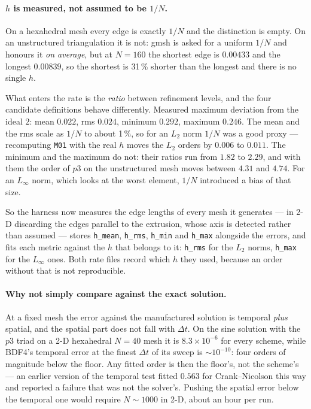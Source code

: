 \documentclass[11pt,a4paper]{article}
\newcommand{\code}[1]{\texttt{\small #1}}
\begin{document}
\paragraph{$h$ is measured, not assumed to be $1/N$.} On a hexahedral mesh every
edge is exactly $1/N$ and the distinction is empty. On an unstructured
triangulation it is not: gmsh is asked for a uniform $1/N$ and honours it
\emph{on average}, but at $N=160$ the shortest edge is $0.00433$ and the longest
$0.00839$, so the shortest is 31\,\% shorter than the longest and there is no
single $h$.

What enters the rate is the \emph{ratio} between refinement levels, and the four
candidate definitions behave differently. Measured maximum deviation from the
ideal $2$: mean $0.022$, rms $0.024$, minimum $0.292$, maximum $0.246$. The mean
and the rms scale as $1/N$ to about 1\,\%, so for an $L_2$ norm $1/N$ was a good
proxy --- recomputing \code{M01} with the real $h$ moves the $L_2$ orders by
$0.006$ to $0.011$. The minimum and the maximum do not: their ratios run from
$1.82$ to $2.29$, and with them the order of $p3$ on the unstructured mesh moves
between $4.31$ and $4.74$. For an $L_\infty$ norm, which looks at the worst
element, $1/N$ introduced a bias of that size.

So the harness now measures the edge lengths of every mesh it generates --- in 2-D
discarding the edges parallel to the extrusion, whose axis is detected rather than
assumed --- stores \code{h\_mean}, \code{h\_rms}, \code{h\_min} and
\code{h\_max} alongside the errors, and fits each metric against the $h$ that
belongs to it: \code{h\_rms} for the $L_2$ norms, \code{h\_max} for the
$L_\infty$ ones. Both rate files record which $h$ they used, because an order
without that is not reproducible.

\paragraph{Why not simply compare against the exact solution.} At a fixed mesh
the error against the manufactured solution is temporal \emph{plus} spatial, and
the spatial part does not fall with $\Delta t$. On the sine solution with the
$p3$ triad on a 2-D hexahedral $N=40$ mesh it is $8.3\times10^{-6}$ for every
scheme, while BDF4's temporal error at the finest $\Delta t$ of its sweep is
$\sim10^{-10}$: four orders of magnitude below the floor. Any fitted order is
then the floor's, not the scheme's --- an earlier version of the temporal test
fitted $0.563$ for Crank--Nicolson this way and reported a failure that was not
the solver's. Pushing the spatial error below the temporal one would require
$N\sim1000$ in 2-D, about an hour per run.
\end{document}
